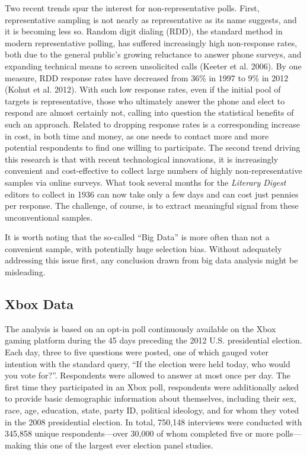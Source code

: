 Two recent trends spur the interest for non-representative polls. First,
representative sampling is not nearly as representative as its name
suggests, and it is becoming less so. Random digit dialing (RDD), the
standard method in modern representative polling, has suffered
increasingly high non-response rates, both due to the general public's
growing reluctance to answer phone surveys, and expanding technical
means to screen unsolicited calls (Keeter et al. 2006). By one measure,
RDD response rates have decreased from 36\% in 1997 to 9\% in 2012
(Kohut et al. 2012). With such low response rates, even if the initial
pool of targets is representative, those who ultimately answer the phone
and elect to respond are almost certainly not, calling into question the
statistical benefits of such an approach. Related to dropping response
rates is a corresponding increase in cost, in both time and money, as
one needs to contact more and more potential respondents to find one
willing to participate. The second trend driving this research is that
with recent technological innovations, it is increasingly convenient and
cost-effective to collect large numbers of highly non-representative
samples via online surveys. What took several months for the
\emph{Literary Digest} editors to collect in 1936 can now take only a
few days and can cost just pennies per response. The challenge, of
course, is to extract meaningful signal from these unconventional
samples.

It is worth noting that the so-called ``Big Data'' is more often than
not a convenient sample, with potentially huge selection bias. Without
adequately addressing this issue first, any conclusion drawn from big
data analysis might be misleading.

\subsection{Xbox Data}\label{xbox-data}

The analysis is based on an opt-in poll continuously available on the
Xbox gaming platform during the 45 days preceding the 2012 U.S.
presidential election. Each day, three to five questions were posted,
one of which gauged voter intention with the standard query, ``If the
election were held today, who would you vote for?''. Respondents were
allowed to answer at most once per day. The first time they participated
in an Xbox poll, respondents were additionally asked to provide basic
demographic information about themselves, including their sex, race,
age, education, state, party ID, political ideology, and for whom they
voted in the 2008 presidential election. In total, 750,148 interviews
were conducted with 345,858 unique respondents---over 30,000 of whom
completed five or more polls---making this one of the largest ever
election panel studies.

